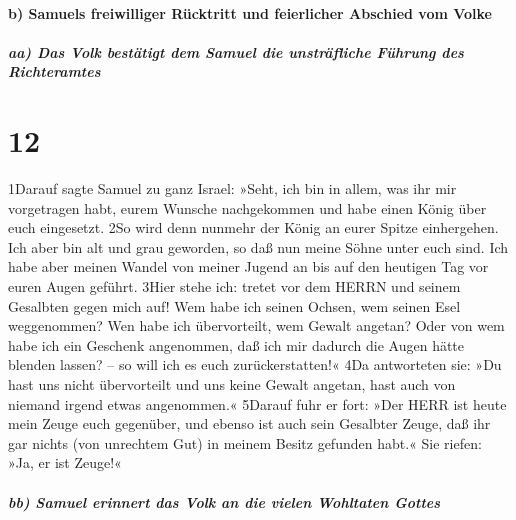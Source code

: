 \hypertarget{b-samuels-freiwilliger-ruxfccktritt-und-feierlicher-abschied-vom-volke}{%
\paragraph{b) Samuels freiwilliger Rücktritt und feierlicher Abschied
vom
Volke}\label{b-samuels-freiwilliger-ruxfccktritt-und-feierlicher-abschied-vom-volke}}

\hypertarget{aa-das-volk-bestuxe4tigt-dem-samuel-die-unstruxe4fliche-fuxfchrung-des-richteramtes}{%
\subparagraph{aa) Das Volk bestätigt dem Samuel die unsträfliche Führung
des
Richteramtes}\label{aa-das-volk-bestuxe4tigt-dem-samuel-die-unstruxe4fliche-fuxfchrung-des-richteramtes}}

\hypertarget{section-11}{%
\section{12}\label{section-11}}

1Darauf sagte Samuel zu ganz Israel: »Seht, ich bin in allem, was ihr
mir vorgetragen habt, eurem Wunsche nachgekommen und habe einen König
über euch eingesetzt. 2So wird denn nunmehr der König an eurer Spitze
einhergehen. Ich aber bin alt und grau geworden, so daß nun meine Söhne
unter euch sind. Ich habe aber meinen Wandel von meiner Jugend an bis
auf den heutigen Tag vor euren Augen geführt. 3Hier stehe ich: tretet
vor dem HERRN und seinem Gesalbten gegen mich auf! Wem habe ich seinen
Ochsen, wem seinen Esel weggenommen? Wen habe ich übervorteilt, wem
Gewalt angetan? Oder von wem habe ich ein Geschenk angenommen, daß ich
mir dadurch die Augen hätte blenden lassen? -- so will ich es euch
zurückerstatten!« 4Da antworteten sie: »Du hast uns nicht übervorteilt
und uns keine Gewalt angetan, hast auch von niemand irgend etwas
angenommen.« 5Darauf fuhr er fort: »Der HERR ist heute mein Zeuge euch
gegenüber, und ebenso ist auch sein Gesalbter Zeuge, daß ihr gar nichts
(von unrechtem Gut) in meinem Besitz gefunden habt.« Sie riefen: »Ja, er
ist Zeuge!«

\hypertarget{bb-samuel-erinnert-das-volk-an-die-vielen-wohltaten-gottes}{%
\subparagraph{bb) Samuel erinnert das Volk an die vielen Wohltaten
Gottes}\label{bb-samuel-erinnert-das-volk-an-die-vielen-wohltaten-gottes}}


